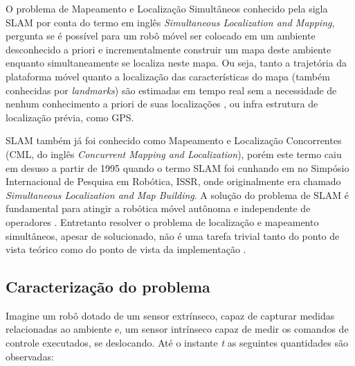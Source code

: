 

O problema de Mapeamento e Localização Simultâneos conhecido pela sigla SLAM por conta do termo em inglês \textit{Simultaneous Localization and Mapping}, pergunta se é possível para um robô móvel ser colocado em um ambiente desconhecido a priori e incrementalmente construir um mapa deste ambiente enquanto simultaneamente se localiza neste mapa. Ou seja, tanto a trajetória da plataforma móvel quanto a localização das características do mapa (também conhecidas por \textit{landmarks}) são estimadas em tempo real sem a necessidade de nenhum conhecimento a priori de suas localizações \cite{durrant2006simultaneous}, ou infra estrutura de localização prévia, como GPS.

SLAM também já foi conhecido como Mapeamento e Localização Concorrentes (CML, do inglês \textit{Concurrent Mapping and Localization}), porém este termo caiu em desuso a partir de 1995 quando o termo SLAM foi cunhando em \cite{durrant1996localization} no Simpósio Internacional de Pesquisa em Robótica, ISSR, onde originalmente era chamado \textit{Simultaneous Localization and Map Building}. A solução do problema de SLAM é fundamental para atingir a robótica móvel autônoma e independente de operadores \cite{durrant2006simultaneous}. Entretanto resolver o problema de localização e mapeamento simultâneos, apesar de solucionado, não é uma tarefa trivial tanto do ponto de vista teórico como do ponto de vista da implementação \cite{durrant1996localization}.

\subsection*{Caracterização do problema}
Imagine um robô dotado de um sensor extrínseco, capaz de capturar medidas relacionadas ao 
ambiente e, um sensor intrínseco capaz de medir os comandos de 
controle executados, se deslocando. Até o instante \emph{t} as seguintes 
quantidades são observadas:

